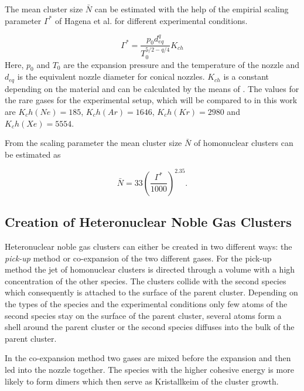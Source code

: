 \begin{figure}[h]
  \centering
  \caption{}
  \label{}
\end{figure}

The mean cluster size $\bar{N}$ can be estimated with
the help of the empirial scaling parameter $\Gamma^*$ of Hagena et al.
\cite{Hagena} for different experimental conditions.

\begin{equation}
 \Gamma^* = \frac{p_0 d_{eq}^q}{T_0^{5/2-q/4}} K_{ch}
\end{equation}
Here, $p_0$ and $T_0$ are the expansion pressure and the temperature
of the nozzle and $d_{eq}$ is the equivalent nozzle diameter for conical
nozzles. $K_{ch}$ is a constant depending on the material and can be
calculated by the means of \cite{xyz}. The values for the rare gases for
the experimental setup, which will be compared to in this work are
$K_ch(Ne)=185$, $K_ch(Ar)=1646$, $K_ch(Kr)=2980$ and $K_ch(Xe)=5554$.

From the scaling parameter the mean cluster size $\bar{N}$ 
of homonuclear clusters can be
estimated as

\begin{equation}
  \bar{N} = 33 \left( \frac{\Gamma^*}{1000} \right) ^{2.35} .
\end{equation}


\subsection{Creation of Heteronuclear Noble Gas Clusters}
Heteronuclear noble gas clusters can either be created in two different ways:
the \emph{pick-up} method or co-expansion of the two different gases.
For the pick-up method the jet of homonuclear clusters is directed through
a volume with a high concentration of the other species. The clusters
collide with the second species which consequently is attached to the surface
of the parent cluster. Depending on the types of the species
and the experimental conditions only few atoms
of the second species stay on the surface of the parent cluster,
several atoms form a shell around the parent cluster or the second species
diffuses into the bulk of the parent cluster.

In the co-expansion method two gases are mixed before the expansion and
then led into the nozzle together. The species with the higher cohesive
energy is more likely to form dimers which then serve as Kristallkeim of
the cluster growth.



